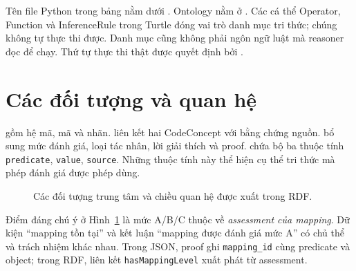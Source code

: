 Tên file Python trong bảng nằm dưới .
Ontology nằm ở .
Các cá thể Operator, Function và InferenceRule trong Turtle đóng vai trò
danh mục tri thức; chúng không tự thực thi được. Danh mục
 cũng không phải ngôn ngữ luật mà reasoner
đọc để chạy. Thứ tự thực thi thật được quyết định bởi .

\section{Các đối tượng và quan hệ}
 gồm hệ mã, mã và nhãn.  liên kết hai
CodeConcept với bằng chứng nguồn.  bổ sung mức đánh
giá, loại tác nhân, lời giải thích và proof.  chứa bộ ba
thuộc tính \texttt{predicate}, \texttt{value}, \texttt{source}.
Những thuộc tính này thể hiện cụ thể tri thức mà phép đánh giá được phép dùng.

\begin{figure}[htbp]
\centering
{}
\caption{Các đối tượng trung tâm và chiều quan hệ được xuất trong RDF.}
\label{fig:objects}
\end{figure}

Điểm đáng chú ý ở Hình~\ref{fig:objects} là mức A/B/C thuộc về
\emph{assessment của mapping}. Dữ kiện “mapping tồn tại” và kết luận
“mapping được đánh giá mức A” có chủ thể và trách nhiệm khác nhau.
Trong JSON, proof ghi \texttt{mapping\_id} cùng predicate và object;
trong RDF, liên kết \texttt{hasMappingLevel} xuất phát từ assessment.

